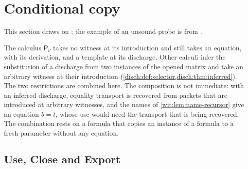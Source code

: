 \section{Conditional copy}
\label{wit:sec:copy}

This section draws on ; the example of an unsound
probe is from .

The calculus $\mathsf{P}_{\nu}$ takes no witness at its introduction and
still takes an equation, with its derivation, and a template at its
discharge.  Other calculi infer the substitution of a discharge from two
instances of the opened matrix and take an arbitrary witness at their
introduction (\cref{disch:def:selector,disch:thm:inferred}).  The two
restrictions are combined here.  The composition is
not immediate: with an inferred discharge, equality transport is recovered
from packets that are introduced at arbitrary witnesses, and the names of
\cref{wit:lem:name-recursor} give an equation $b=t$, whose use would need
the transport that is being recovered.  The combination rests on a formula
that copies an instance of a formula to a fresh parameter without any
equation.

\subsection{Use, Close and Export}

